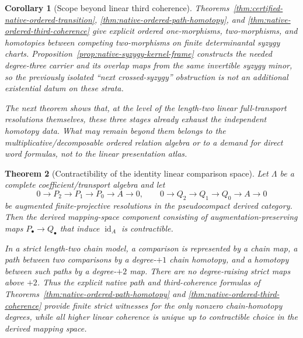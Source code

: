 \documentclass[11pt]{article}
\newtheorem{theorem}{Theorem}[section]
\newtheorem{corollary}[theorem]{Corollary}
\theoremstyle{definition}
\begin{document}
\begin{corollary}[Scope beyond linear third coherence]\label{cor:native-ordered-third-coherence-boundary}
Theorems~\ref{thm:certified-native-ordered-transition},
\ref{thm:native-ordered-path-homotopy}, and
\ref{thm:native-ordered-third-coherence} give explicit ordered
one-morphisms, two-morphisms, and homotopies between competing two-morphisms
on finite determinantal syzygy charts.  Proposition~\ref{prop:native-syzygy-kernel-frame}
constructs the needed degree-three carrier and its overlap maps from the same
invertible syzygy minor, so the previously isolated ``next crossed-syzygy''
obstruction is not an additional existential datum on these strata.

The next theorem shows that, at the level of the length-two linear
full-transport resolutions themselves, these three stages already exhaust the
independent homotopy data.  What may remain beyond them belongs to the
multiplicative/decomposable ordered relation algebra or to a demand for direct
word formulas, not to the linear presentation atlas.
\end{corollary}


\begin{theorem}[Contractibility of the identity linear comparison space]\label{thm:presentation-linear-comparison-contractible}
Let $\Lambda$ be a complete coefficient/transport algebra and let
\[
 0\to P_2\to P_1\to P_0\to A\to0,
 \qquad
 0\to Q_2\to Q_1\to Q_0\to A\to0
\]
be augmented finite-projective resolutions in the pseudocompact derived category.
Then the derived mapping-space component consisting of augmentation-preserving
maps $P_\bullet\to Q_\bullet$ that induce $\operatorname{id}_A$ is contractible.

In a strict length-two chain model, a comparison is represented by a chain map,
a path between two comparisons by a degree-$+1$ chain homotopy, and a homotopy
between such paths by a degree-$+2$ map.  There are no degree-raising strict maps
above $+2$.  Thus the explicit native path and third-coherence formulas of
Theorems~\ref{thm:native-ordered-path-homotopy} and
\ref{thm:native-ordered-third-coherence} provide finite strict witnesses for the
only nonzero chain-homotopy degrees, while all higher linear coherence is unique
up to contractible choice in the derived mapping space.
\end{theorem}
\end{document}
